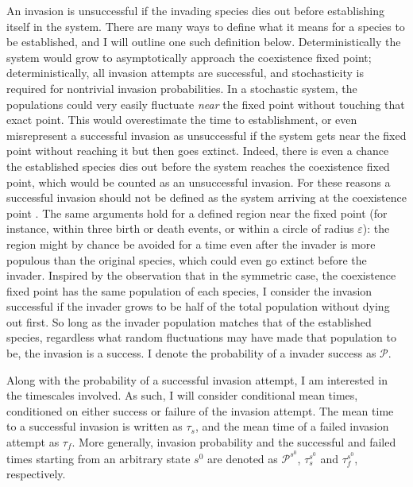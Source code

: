 An invasion is unsuccessful if the invading species dies out before establishing itself in the system. 
There are many ways to define what it means for a species to be established, and I will outline one such definition below. 
Deterministically the system would grow to asymptotically approach the coexistence fixed point; deterministically, all invasion attempts are successful, and stochasticity is required for nontrivial invasion probabilities. 
In a stochastic system, the populations could very easily fluctuate \emph{near} the fixed point without touching that exact point. 
This would overestimate the time to establishment, or even misrepresent a successful invasion as unsuccessful if the system gets near the fixed point without reaching it but then goes extinct. 
Indeed, there is even a chance the established species dies out before the system reaches the coexistence fixed point, which would be counted as an unsuccessful invasion. 
For these reasons a successful invasion should not be defined as the system arriving at the coexistence point \cite{Parsons2018}. 
The same arguments hold for a defined region near the fixed point (for instance, within three birth or death events, or within a circle of radius $\varepsilon$): the region might by chance be avoided for a time even after the invader is more populous than the original species, which could even go extinct before the invader. 
Inspired by the observation that in the symmetric case, the coexistence fixed point has the same population of each species, I consider the invasion successful if the invader grows to be half of the total population without dying out first. 
So long as the invader population matches that of the established species, regardless what random fluctuations may have made that population to be, the invasion is a success. %
I denote the probability of a invader success as $\mathcal{P}$. 

Along with the probability of a successful invasion attempt, I am interested in the timescales involved. 
As such, I will consider conditional mean times, conditioned on either success or failure of the invasion attempt. 
The mean time to a successful invasion is written as $\tau_s$, and the mean time of a failed invasion attempt as $\tau_f$. 
More generally, invasion probability and the successful and failed times starting from an arbitrary state $s^0$ are denoted as $\mathcal{P}^{s^0}$, $\tau_s^{s^0}$ and $\tau_f^{s^0}$, respectively. 

